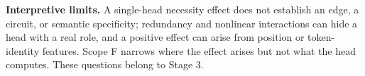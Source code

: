 \textbf{Interpretive limits.} A single-head necessity effect does not establish an edge, a circuit, or semantic specificity; redundancy and nonlinear interactions can hide a head with a real role, and a positive effect can arise from position or token-identity features. Scope F narrows where the effect arises but not what the head computes. These questions belong to Stage 3.

